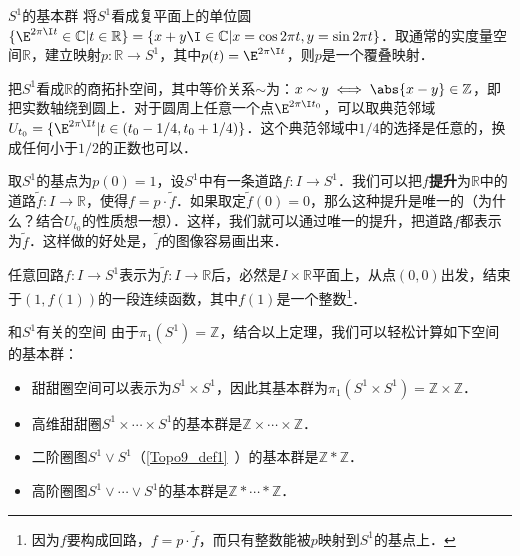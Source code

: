 
\begin{example}{$S^1$的基本群}
将$S^1$看成复平面上的单位圆$\{\E^{2\pi\I t}\in\mathbb{C}|t\in\mathbb{R}\}=\{x+y\I\in\mathbb{C}|x=\cos{2\pi t}, y=\sin{2\pi t}\}$．取通常的实度量空间$\mathbb{R}$，建立映射$p:\mathbb{R}\rightarrow S^1$，其中$p(t)=\E^{2\pi\I t}$，则$p$是一个覆叠映射．

把$S^1$看成$\mathbb{R}$的商拓扑空间，其中等价关系$\sim$为：$x\sim y\iff \abs{x-y}\in\mathbb{Z}$，即把实数轴绕到圆上．对于圆周上任意一个点$\E^{2\pi\I t_0}$，可以取典范邻域$U_{t_0}=\{\E^{2\pi\I t}|t\in(t_0-1/4, t_0+1/4)\}$．这个典范邻域中$1/4$的选择是任意的，换成任何小于$1/2$的正数也可以．

取$S^1$的基点为$p(0)=1$，设$S^1$中有一条道路$f:I\rightarrow S^1$．我们可以把$f$\textbf{提升}为$\mathbb{R}$中的道路$\tilde{f}:I\rightarrow\mathbb{R}$，使得$f=p\cdot\tilde{f}$．如果取定$\tilde{f}(0)=0$，那么这种提升是唯一的（为什么？结合$U_{t_0}$的性质想一想）．这样，我们就可以通过唯一的提升，把道路$f$都表示为$\tilde{f}$．这样做的好处是，$\tilde{f}$的图像容易画出来．

任意回路$f:I\rightarrow S^1$表示为$\tilde{f}:I\rightarrow\mathbb{R}$后，必然是$I\times\mathbb{R}$平面上，从点$(0, 0)$出发，结束于$(1, f(1))$的一段连续函数，其中$f(1)$是一个整数\footnote{因为$f$要构成回路，$f=p\cdot\tilde{f}$，而只有整数能被$p$映射到$S^1$的基点上．}．
\end{example}

\begin{example}{和$S^1$有关的空间}
由于$\pi_1(S^1)=\mathbb{Z}$，结合以上定理，我们可以轻松计算如下空间的基本群：
\begin{itemize}
\item 甜甜圈空间可以表示为$S^1\times S^1$，因此其基本群为$\pi_1(S^1\times S^1)=\mathbb{Z}\times\mathbb{Z}$．
\item 高维甜甜圈$S^1\times\cdots\times S^1$的基本群是$\mathbb{Z}\times\cdots\times\mathbb{Z}$．
\item 二阶圈图$S^1\vee S^1$（\autoref{Topo9_def1}~）的基本群是$\mathbb{Z}*\mathbb{Z}$．
\item 高阶圈图$S^1\vee\cdots\vee S^1$的基本群是$\mathbb{Z}*\cdots*\mathbb{Z}$．
\end{itemize}

\end{example}



